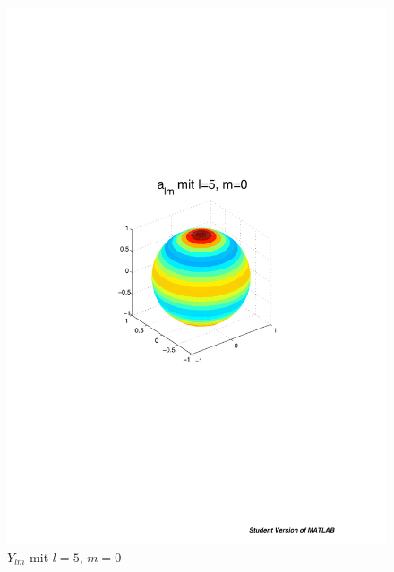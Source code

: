 \begin{refsection}
\begin{figure}
\begin{minipage}[hbt]{0.4\textwidth}
\centering
\includegraphics[width=1\textwidth]{kugel/ylm/a_5_0.pdf}
\caption{$Y_{lm}$ mit $l=5$, $m=0$}
\label{skript:ylm l=5 m=0}
\end{minipage}
\hfill
\begin{minipage}[hbt]{0.4\textwidth}
\centering

\end{minipage}
\end{figure}
\end{refsection}
